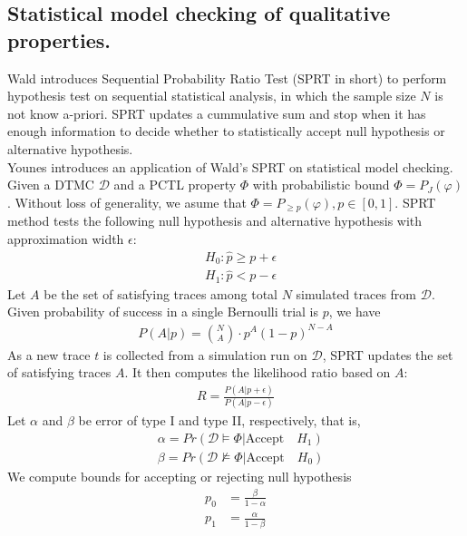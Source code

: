 \subsection{Statistical model checking of qualitative properties.}
Wald \cite{wald1945sequential} introduces Sequential Probability Ratio Test (SPRT in short) to perform
hypothesis test on sequential statistical analysis, in which the sample size $N$ is not know
a-priori. SPRT updates a cummulative sum and stop when it has enough information to decide whether
to statistically accept null hypothesis or alternative hypothesis.\\
Younes \cite{younes2002probabilistic} introduces an application of Wald's SPRT on statistical model
checking. Given a DTMC $\mathcal{D}$ and a PCTL property $\Phi$ with probabilistic bound $\Phi =
      P_J(\varphi)$. Without loss of generality, we asume that $\Phi = P_{\geq p}(\varphi),
      p\in[0,1]$. SPRT method tests the following null hypothesis and alternative hypothesis with
approximation width $\epsilon$:
\begin{align*}
       & H_0: \hat{p} \geq p + \epsilon \\
       & H_1: \hat{p} < p - \epsilon
\end{align*}
Let $A$ be the set of satisfying traces among total $N$ simulated traces from $\mathcal{D}$. Given
probability of success in a single Bernoulli trial is $p$, we have
\begin{align*}
      P(A | p) = {N \choose A} \cdot p^A(1-p)^{N-A}
\end{align*}
As a new trace $t$ is collected from a simulation run on $\mathcal{D}$, SPRT updates the set of
satisfying traces $A$. It then computes the likelihood ratio based on $A$:
\begin{align*}
      R = \frac{P(A | p + \epsilon)}{P(A | p - \epsilon)}
\end{align*}
Let $\alpha$ and $\beta$ be error of type I and type II, respectively, that is,
\begin{align*}
       & \alpha = Pr(\mathcal{D} \models \Phi | \text{Accept}\quad H_1) \\
       & \beta =  Pr(\mathcal{D} \nvDash \Phi | \text{Accept}\quad H_0)
\end{align*}
We compute bounds for accepting or rejecting null hypothesis
\begin{align*}
      p_0 & = \frac{\beta}{1 - \alpha} \\
      p_1 & = \frac{\alpha}{1 - \beta}
\end{align*}
